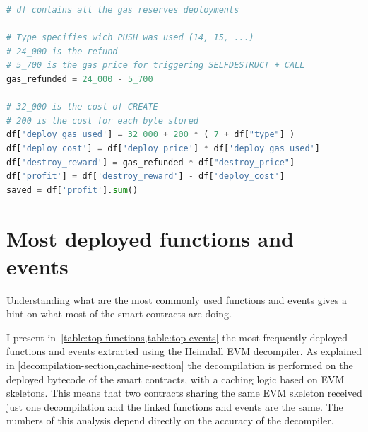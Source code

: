 \begin{lstlisting}[language=Python,label={lst:gas-calc},caption={Code for computing the total Eth saved with the GasToken pattern.},captionpos=b]
# df contains all the gas reserves deployments 

# Type specifies wich PUSH was used (14, 15, ...)
# 24_000 is the refund
# 5_700 is the gas price for triggering SELFDESTRUCT + CALL
gas_refunded = 24_000 - 5_700 

# 32_000 is the cost of CREATE
# 200 is the cost for each byte stored
df['deploy_gas_used'] = 32_000 + 200 * ( 7 + df["type"] )
df['deploy_cost'] = df['deploy_price'] * df['deploy_gas_used']
df['destroy_reward'] = gas_refunded * df["destroy_price"]
df['profit'] = df['destroy_reward'] - df['deploy_cost']
saved = df['profit'].sum()
\end{lstlisting}

\newpage

\section{Most deployed functions and events}

Understanding what are the most commonly used functions and events gives a hint on what most of the smart contracts are doing.

I present in~\cref{table:top-functions,table:top-events} the most frequently deployed functions and events extracted using the Heimdall EVM decompiler. As explained in \cref{decompilation-section,cachine-section} the decompilation is performed on the deployed bytecode of the smart contracts, with a caching logic based on EVM skeletons. This means that two contracts sharing the same EVM skeleton received just one decompilation and the linked functions and events are the same. The numbers of this analysis depend directly on the accuracy of the decompiler.


